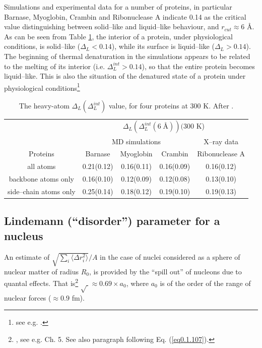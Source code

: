 \begin{subappendices}
Simulations and experimental data for a number of proteins, in particular Barnase, Myoglobin, Crambin and Ribonuclease A indicate 0.14 as the critical value distinguishing between solid--like and liquid--like behaviour, and $r_{cut}\approx 6$ \AA. As can be seen from Table \ref{tab2C1}, the interior of a protein, under physiological conditions, is solid--like  ($\Delta_L<0.14$), while its surface is liquid--like ($\Delta_L>0.14$). The beginning of thermal denaturation in the simulations appears to be related to the melting of its interior (i.e. $\Delta^{int}_L>0.14$), so that the entire protein becomes liquid--like. This is also the situation of the denatured state of a protein under physiological conditions\footnote{see e.g. \cite{Rosner:17}.} 



\begin{table}[h]
 \begin{tabular}{|c|c|c|c|c|}
 \hline
 &\multicolumn{4}{|c|}{$\Delta_L(\Delta_L^{int}(6\;\text{\AA}))(300$ K)}\\
 \cline{2-5}
 &\multicolumn{3}{|c|}{MD simulations}&X--ray data\\
 \hline
 Proteins&Barnase&Myoglobin&Crambin&Ribonuclease A\\
 \hline
 all atoms&0.21(0.12)&0.16(0.11)&0.16(0.09)&0.16(0.12)\\
 backbone atoms only&0.16(0.10)&0.12(0.09)&0.12(0.08)&0.13(0.10)\\
 side--chain atoms only&0.25(0.14)&0.18(0.12)&0.19(0.10)&0.19(0.13)\\
 \hline
 \end{tabular}
 \caption{The heavy-atom $\Delta_L(\Delta_L^{int})$ value, for four proteins at 300 K. After \cite{Zhou:99}.}\label{tab2C1}
 \end{table}

\subsection{Lindemann (``disorder'') parameter for a nucleus}
An estimate of  $\sqrt{\sum_i\langle \Delta r_i^2\rangle}/A$ in the case of nuclei considered as a sphere of nuclear matter of radius $R_0$, is provided by the ``spill out'' of nucleons due to quantal effects. That is\footnote{\cite{Bertsch:05}, see e.g. Ch. 5. See also paragraph following Eq. (\ref{eq0.1.107}).} $\sqrt{\;}\approx 0.69\times a_0$, where $a_0$ is of the order of the range of nuclear forces ($\approx 0.9$ fm).



\end{subappendices}
